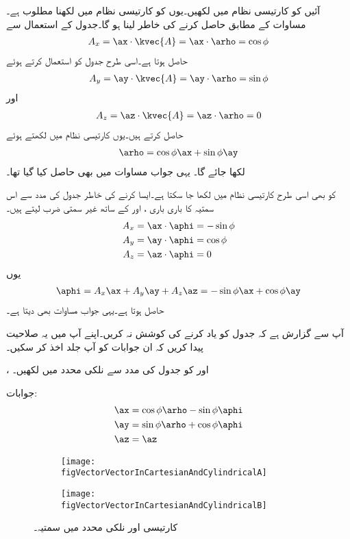 آئیں  کو کارتیسی نظام میں لکھیں۔یوں  کو  کارتیسی نظام میں لکھنا مطلوب ہے۔مساوات  کے مطابق   حاصل کرنے کی خاطر  لینا ہو گا۔جدول  کے استعمال سے
\begin{align*}
A_x=\ax \cdot \kvec{A}=\ax \cdot \arho=\cos \phi
\end{align*}  
حاصل ہوتا ہے۔اسی طرح جدول کو استعمال کرتے ہوئے
\begin{align*}
A_y=\ay \cdot \kvec{A}=\ay \cdot \arho=\sin \phi
\end{align*}
اور 
\begin{align*}
A_z=\az \cdot \kvec{A}=\az \cdot \arho=0
\end{align*}
حاصل کرتے  ہیں۔یوں کارتیسی نظام میں  لکھتے ہوئے
\begin{align*}
\arho = \cos \phi \ax +\sin \phi \ay
\end{align*}
لکھا جائے گا۔ یہی جواب مساوات  میں بھی حاصل کیا گیا تھا۔

 کو بھی اسی طرح کارتیسی نظام میں لکھا جا سکتا ہے۔ایسا کرنے کی خاطر جدول  کی مدد سے  اس سمتیہ کا باری باری ،  اور  کے ساتھ غیر سمتی ضرب لیتے ہیں۔
\begin{align*}
A_x&=\ax \cdot \aphi=-\sin \phi\\
A_y&=\ay \cdot \aphi=\cos \phi\\
A_z&=\az \cdot \aphi=0
\end{align*}
یوں
\begin{align*}
\aphi=A_x \ax+A_y \ay+A_z \az = -\sin \phi \ax+\cos \phi \ay
\end{align*}
حاصل ہوتا ہے۔یہی جواب مساوات  بھی دیتا ہے۔

آپ سے گزارش ہے کہ جدول  کو یاد کرنے کی کوشش نہ کریں۔اپنے آپ میں یہ صلاحیت پیدا کریں کہ ان جوابات کو آپ جلد اخذ کر سکیں۔

،  اور  کو جدول  کی مدد سے  نلکی محدد میں لکھیں۔

جوابات:
\begin{align*}
\ax&=\cos \phi \arho-\sin \phi \aphi\\
\ay&=\sin \phi \arho+\cos \phi \aphi\\
\az&=\az
\end{align*}
%
\begin{figure}
\centering
\begin{subfigure}{0.5\textwidth}
\centering
\texttt{[image: figVectorVectorInCartesianAndCylindricalA]}
\end{subfigure}%
%
\begin{subfigure}{0.5\textwidth}
\centering
\texttt{[image: figVectorVectorInCartesianAndCylindricalB]}
\end{subfigure}%
\caption{کارتیسی اور نلکی محدد میں سمتیہ۔}
\label{شکل_سمتیہ_کارتیسی_نلکی_مساوات}
\end{figure}

